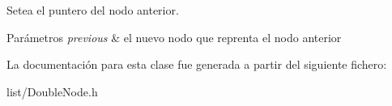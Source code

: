 Setea el puntero del nodo anterior. 


\begin{DoxyParams}{Parámetros}
{\em previous} & el nuevo nodo que reprenta el nodo anterior \\
\hline
\end{DoxyParams}


La documentación para esta clase fue generada a partir del siguiente fichero\-:\begin{DoxyCompactItemize}
\item 
list/Double\-Node.\-h\end{DoxyCompactItemize}
